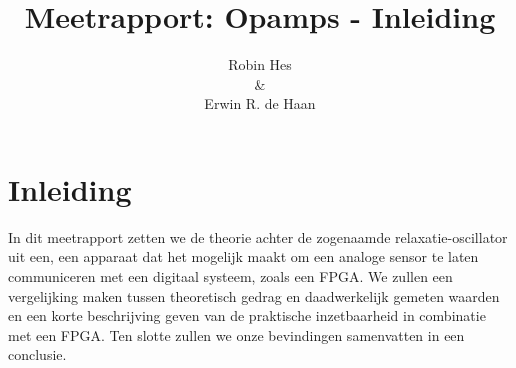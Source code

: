 \documentclass{report}
\title{Meetrapport: Opamps - Inleiding}
\author{Robin Hes\\\&\\Erwin R. de Haan}
\begin{document}
\chapter{Inleiding}

In dit meetrapport zetten we de theorie achter de zogenaamde relaxatie-oscillator uit een, een apparaat dat het mogelijk maakt om een analoge sensor te laten communiceren met een digitaal systeem, zoals een FPGA. We zullen een vergelijking maken tussen theoretisch gedrag en daadwerkelijk gemeten waarden en een korte beschrijving geven van de praktische inzetbaarheid in combinatie met een FPGA. Ten slotte zullen we onze bevindingen samenvatten in een conclusie.
\end{document}
